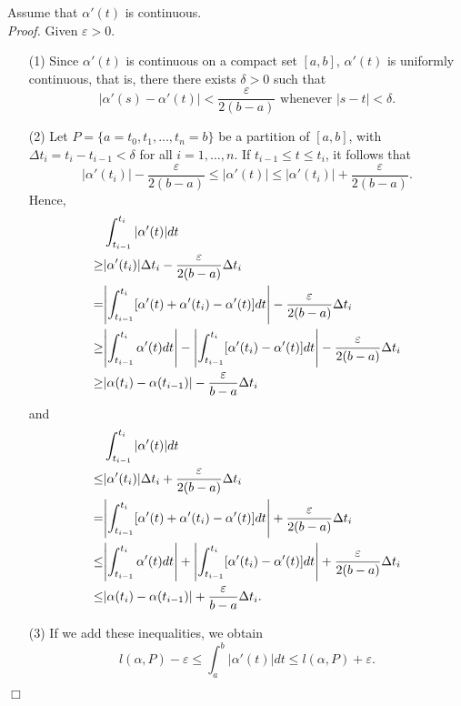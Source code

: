 \documentclass{article}
\begin{document}
Assume that $\alpha'(t)$ is continuous. \\

\emph{Proof.}
Given $\varepsilon > 0$.
\begin{enumerate}
\item[(1)]
  Since $\alpha'(t)$ is continuous on a compact set $[a,b]$,
  $\alpha'(t)$ is uniformly continuous, that is,
  there there exists $\delta > 0$ such that
  \[
    |\alpha'(s) - \alpha'(t)| < \frac{\varepsilon}{2(b-a)}
    \text{ whenever } |s-t| < \delta.
  \]
\item[(2)]
  Let $P = \{a = t_0, t_1, \ldots, t_n = b \}$
  be a partition of $[a,b]$, with $\Delta t_i = t_i - t_{i-1} < \delta$
  for all $i = 1, \ldots, n$.
  If $t_{i-1} \leq t \leq t_i$, it follows that
  \[
    |\alpha'(t_i)| - \frac{\varepsilon}{2(b-a)}
    \leq |\alpha'(t)|
    \leq |\alpha'(t_i)| + \frac{\varepsilon}{2(b-a)}.
  \]
  Hence,
  \begin{align*}
    &\int_{t_{i-1}}^{t_i} |\alpha'(t)| dt \\
    \geq& |\alpha'(t_i)| \Delta t_i
      - \frac{\varepsilon}{2(b-a)} \Delta t_i \\
    =& \abs{ \int_{t_{i-1}}^{t_i} [\alpha'(t)+\alpha'(t_i)-\alpha'(t)] dt }
      - \frac{\varepsilon}{2(b-a)} \Delta t_i \\
    \geq& \abs{ \int_{t_{i-1}}^{t_i} \alpha'(t) dt }
      - \abs{ \int_{t_{i-1}}^{t_i} [\alpha'(t_i)-\alpha'(t)] dt }
      - \frac{\varepsilon}{2(b-a)} \Delta t_i \\
    \geq& \abs{ \alpha(t_i) - \alpha(t_{i-1}) }
      - \frac{\varepsilon}{b-a} \Delta t_i
  \end{align*}
  and
  \begin{align*}
    &\int_{t_{i-1}}^{t_i} |\alpha'(t)| dt \\
    \leq& |\alpha'(t_i)| \Delta t_i
      + \frac{\varepsilon}{2(b-a)} \Delta t_i \\
    =& \abs{ \int_{t_{i-1}}^{t_i} [\alpha'(t)+\alpha'(t_i)-\alpha'(t)] dt }
      + \frac{\varepsilon}{2(b-a)} \Delta t_i \\
    \leq& \abs{ \int_{t_{i-1}}^{t_i} \alpha'(t) dt }
      + \abs{ \int_{t_{i-1}}^{t_i} [\alpha'(t_i)-\alpha'(t)] dt }
      + \frac{\varepsilon}{2(b-a)} \Delta t_i \\
    \leq& \abs{ \alpha(t_i) - \alpha(t_{i-1}) }
      + \frac{\varepsilon}{b-a} \Delta t_i.
  \end{align*}

\item[(3)]
  If we add these inequalities, we obtain
  \[
    l(\alpha,P) - \varepsilon
    \leq \int_{a}^{b} |\alpha'(t)| dt
    \leq l(\alpha,P) + \varepsilon.
  \]
\end{enumerate}
$\Box$ \\\\
\end{document}
